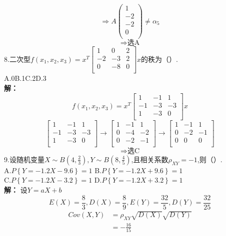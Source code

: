 \documentclass[a4paper]{article}
\begin{document}
$$\Rightarrow A\begin{pmatrix}
    1\\
    -2\\
    -2\\
    0\\
\end{pmatrix} \neq \alpha_5$$
$$\Rightarrow \text{选A}$$
8.二次型$f\left(x_1,x_2,x_3\right)=x^T \begin{bmatrix}
    1&0&2\\
    -2&-3&2\\
    0&-8&0\\
\end{bmatrix}x$的秩为（\quad）.\\
A.0\hfill B.1\hfill C.2\hfill D.3\\
\textbf{解：}
$$f\left(x_1,x_2,x_3\right)=x^T \begin{bmatrix}
    1&-1&1\\
    -1&-3&-3\\
    1&-3&0\\
\end{bmatrix}x$$
$$\begin{bmatrix}
    1&-1&1\\
    -1&-3&-3\\
    1&-3&0\\
\end{bmatrix} \rightarrow \begin{bmatrix}
    1&-1&1\\
    0&-4&-2\\
    0&-2&-1\\
\end{bmatrix} \rightarrow \begin{bmatrix}
    1&-1&1\\
    0&-2&-1\\
    0&0&0\\
\end{bmatrix}$$
$$\Rightarrow \text{选C}$$
\newpage
\noindent
9.设随机变量$X\sim B\left(4,\frac{2}{3}\right),Y\sim B\left(8,\frac{4}{5}\right)$,且相关系数$\rho_{XY}=-1$,则（\quad）.\\
A.$P\left\{Y=-1.2X-9.6\right\}=1$\hfill
B.$P\left\{Y=-1.2X+9.6\right\}=1$\\
C.$P\left\{Y=-1.2X-3.2\right\}=1$\hfill
D.$P\left\{Y=-1.2X+3.2\right\}=1$\\
\textbf{解：}
  设$Y=aX+b$
  $$E(X)=\frac{8}{3},D(X)=\frac{8}{9},E(Y)=\frac{32}{5},D(Y)=\frac{32}{25}$$
  \begin{align*}
    Cov(X,Y)&=\rho_{XY}\sqrt{D(X)}\sqrt{D(Y)}\\
            &=-\frac{16}{15}
  \end{align*}
\end{document}
